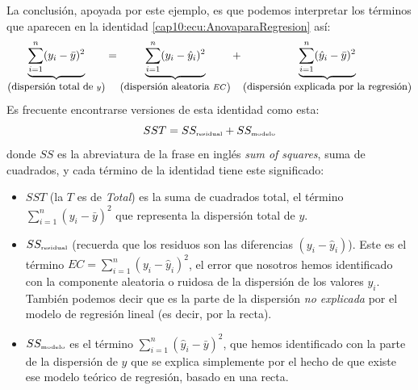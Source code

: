 La conclusión, apoyada por este ejemplo, es que podemos interpretar los términos que aparecen en la identidad \ref{cap10:ecu:AnovaparaRegresion} así:
\[
        \underbrace{ \displaystyle\sum_{i=1}^{n}(y_i-\bar y)^2}_{\left(\mbox{\small dispersión total de }y\right)}=
        \underbrace{\displaystyle\sum_{i=1}^n(y_i-\hat y_i)^2}_{\left(\mbox{\small dispersión aleatoria }EC\right)}+
        \underbrace{\displaystyle\sum_{i=1}^n(\hat y_i-\bar y)^2}_{\left(\mbox{\small dispersión explicada por la regresión}\right)}
\]
Es frecuente encontrarse versiones de esta identidad como esta:
\begin{equation}\label{cap10:ecu:versionSSidentidadAnova}
SST = SS_{\mbox{\tiny residual}} + SS_{\mbox{\tiny modelo}}
\end{equation}
donde $SS$ es la abreviatura de la frase en inglés {\em sum of squares}, {\sf suma de cuadrados}, y cada término de la identidad tiene este significado:
\begin{itemize}
  \item $SST$ (la $T$ es de {\em Total}) es la suma de cuadrados total, el término $\displaystyle\sum_{i=1}^{n}(y_i-\bar y)^2$ que representa la dispersión total de $y$.
  \item $SS_{\mbox{\tiny residual}}$ (recuerda que los residuos son las diferencias $(y_i-\hat
      y_i)$). Este es el término $EC=\displaystyle\sum_{i=1}^n(y_i-\hat y_i)^2$, el error que
      nosotros hemos identificado con la componente aleatoria o ruidosa de la dispersión de los
      valores $y_i$. También podemos decir que es la parte de la dispersión {\em no explicada}
      por el modelo de regresión lineal (es decir, por la recta).
  \item $SS_{\mbox{\tiny modelo}}$ es el término $\displaystyle\sum_{i=1}^n(\hat y_i-\bar y)^2$,
      que hemos identificado con la parte de la dispersión de $y$ que se explica simplemente por
      el hecho de que existe ese modelo teórico de regresión, basado en una recta.

\end{itemize}

